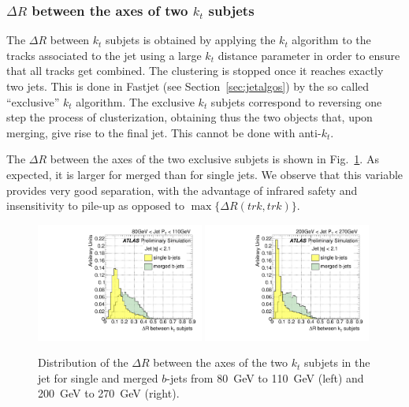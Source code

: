 
\subsubsection{$\Delta R$ between the axes of two $k_t$ subjets}  

The $\Delta R$ between $k_t$ subjets is obtained by applying the $k_t$ algorithm to the tracks associated to the jet using a large $k_t$ distance parameter in order to ensure that all tracks get combined. The clustering is stopped once it reaches exactly two jets. This is done in Fastjet (see Section~\ref{sec:jetalgos}) by the so called ``exclusive'' $k_t$ algorithm. The exclusive $k_t$ subjets correspond to reversing one step the process of clusterization, obtaining thus the two objects that, upon merging, give rise to the final jet. This cannot be done with anti-$k_t$.

 The $\Delta R$ between the axes of the two exclusive subjets is shown in Fig.~\ref{fig:drktsinglemerged}.  As expected, it is larger for merged than for single jets. We observe that this
variable provides very good separation, with the advantage of infrared safety and insensitivity to pile-up as opposed to $\max\{\Delta R(trk,trk)\}$.

\begin{figure}[tp]
\centering
\includegraphics[width=0.49\textwidth]{FIGS/VarsSingleMerged/DRkt2axes080.pdf}
\includegraphics[width=0.49\textwidth]{FIGS/VarsSingleMerged/DRkt2axes200.pdf}
\caption{Distribution of the $\Delta R$ between the axes of the two $k_t$ subjets in the jet for single and merged $b$-jets from 80~GeV to 110~GeV (left) and 200~GeV to 270~GeV (right).}
\label{fig:drktsinglemerged}
\end{figure}

